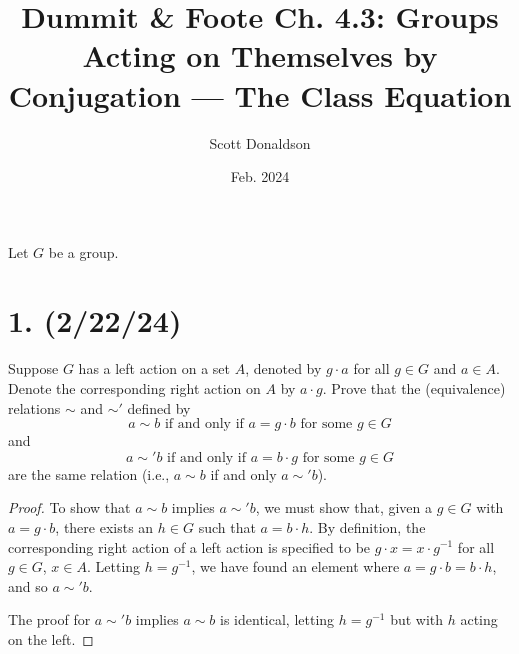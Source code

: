 \documentclass{article}
\title{Dummit \& Foote Ch. 4.3: Groups Acting on Themselves by Conjugation — The Class Equation}
\author{Scott Donaldson}
\date{Feb. 2024}
\begin{document}
\maketitle

Let $G$ be a group.

\section*{1. (2/22/24)}

Suppose $G$ has a left action on a set $A$, denoted by $g \cdot a$ for all $g \in G$ and $a \in A$. Denote the corresponding right action on $A$ by $a \cdot g$. Prove that the (equivalence) relations $\sim$ and $\sim'$ defined by
\begin{equation*}
    a \sim b \text{ if and only if } a = g \cdot b \text{ for some } g \in G
\end{equation*}
and
\begin{equation*}
    a \sim' b \text{ if and only if } a = b \cdot g \text{ for some } g \in G
\end{equation*}
are the same relation (i.e., $a \sim b$ if and only $a \sim' b$).

\begin{proof}
    To show that $a \sim b$ implies $a \sim' b$, we must show that, given a $g \in G$ with $a = g \cdot b$, there exists an $h \in G$ such that $a = b \cdot h$. By definition, the corresponding right action of a left action is specified to be $g \cdot x = x \cdot g^{-1}$ for all $g \in G$, $x \in A$. Letting $h = g^{-1}$, we have found an element where $a = g \cdot b = b \cdot h$, and so $a \sim' b$.

    The proof for $a \sim' b$ implies $a \sim b$ is identical, letting $h = g^{-1}$ but with $h$ acting on the left.
\end{proof}
\end{document}
